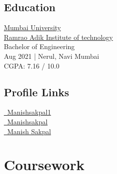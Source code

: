\documentclass[]{d}
\begin{document}
%
%
\lastupdated

%
%

%
%

\begin{minipage}[t]{0.33\textwidth} 


\subsection{Education}
\href{https://mu.ac.in/}{Mumbai University}\\
\href{http://www.dypatil.edu/engineering/index.php}{Ramrao Adik Institute of technology}\\
{Bachelor of Engineering}\\
{Aug 2021 | Nerul, Navi Mumbai}\\
{  CGPA: 7.16 / 10.0 }\\
\sectionsep

\subsection{Profile Links}
\href{https://www.techgig.com/manishsakpal1}{\faGlobe~Manishsakpal1} \\
\href{https://github.com/Manishsakpal}{\faGithub~Manishsakpal} \\
\href{https://www.linkedin.com/in/manish-sakpal-b497b2165}{\faLinkedin~Manish Sakpal}\\


\section{Coursework}

\end{minipage}
\end{document}
